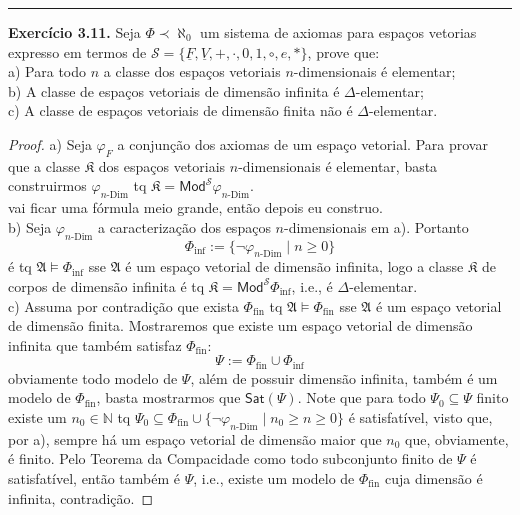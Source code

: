 \documentclass[11pt]{article}
\newcommand{\mc}[1]{\mathcal{#1}}
\newcommand{\mf}[1]{\mathfrak{#1}}
\newcommand{\msf}[1]{\mathsf{#1}}
\newcommand{\mbb}[1]{\mathbb{#1}}
\begin{document}
\hrule

\begin{shaded}
\textbf{Exercício 3.11.} Seja $\Phi\prec\aleph_0$ um sistema de axiomas para espaços vetorias expresso em termos de $\mc{S}=\{\underline{F},\underline{V},+,\cdot,0,1,\circ,e,*\}$, prove que:\\
a) Para todo $n$ a classe dos espaços vetoriais $n$-dimensionais é elementar;\\
b) A classe de espaços vetoriais de dimensão infinita é $\Delta$-elementar;\\
c) A classe de espaços vetoriais de dimensão finita não é $\Delta$-elementar.
\end{shaded}

\begin{proof}
    a) Seja $\varphi_F$ a conjunção dos axiomas de um espaço vetorial. Para provar que a classe $\mf{K}$ dos espaços vetoriais $n$-dimensionais é elementar, basta construirmos $\varphi_{n\text{-Dim}}$ tq $\mf{K}=\msf{Mod}^\mc{S}\varphi_{n\text{-Dim}}$.\\
    \textbf{\color{red}{PENDENTE}} vai ficar uma fórmula meio grande, então depois eu construo.
    \\
    b) Seja $\varphi_{n\text{-Dim}}$ a caracterização dos espaços $n$-dimensionais em a). Portanto $$\Phi_\text{inf}:=\{\neg\varphi_{n\text{-Dim}}\mid n\ge0\}$$ é tq $\mf{A}\vDash\Phi_\text{inf}$ sse $\mf{A}$ é um espaço vetorial de dimensão infinita, logo a classe $\mf{K}$ de corpos de dimensão infinita é tq $\mf{K}=\msf{Mod}^\mc{S}\Phi_\text{inf}$, i.e., é $\Delta$-elementar.\\
    c) Assuma por contradição que exista $\Phi_\text{fin}$ tq $\mf{A}\vDash\Phi_\text{fin}$ sse $\mf{A}$ é um espaço vetorial de dimensão finita. Mostraremos que existe um espaço vetorial de dimensão infinita que também satisfaz $\Phi_\text{fin}$: $$\Psi:=\Phi_\text{fin}\cup\Phi_\text{inf}$$ obviamente todo modelo de $\Psi$, além de possuir dimensão infinita, também é um modelo de $\Phi_\text{fin}$, basta mostrarmos que $\msf{Sat}(\Psi)$. Note que para todo $\Psi_0\subseteq\Psi$ finito existe um $n_0\in\mbb{N}$ tq $\Psi_0\subseteq\Phi_\text{fin}\cup\{\neg\varphi_{n\text{-Dim}}\mid n_0\ge n\ge0\}$ é satisfatível, visto que, por a), sempre há um espaço vetorial de dimensão maior que $n_0$ que, obviamente, é finito. Pelo Teorema da Compacidade como todo subconjunto finito de $\Psi$ é satisfatível, então também é $\Psi$, i.e., existe um modelo de $\Phi_\text{fin}$ cuja dimensão é infinita, contradição.
\end{proof}
\end{document}
